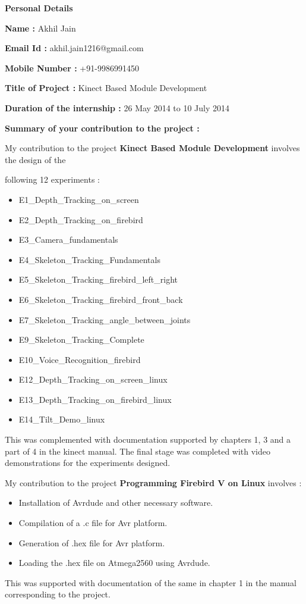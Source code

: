 \documentclass[20pt]{report}
\begin{document}
\hspace{2.5in}
\textbf{Personal Details}
\medskip

\textbf{Name : }
Akhil Jain
\medskip


\textbf{Email Id : }
akhil.jain1216@gmail.com
\medskip


\textbf{Mobile Number : }
+91-9986991450
\medskip


\textbf{Title of Project : }
Kinect Based Module Development
\medskip


\textbf{Duration of the internship : }
26 May 2014 to 10 July 2014
\medskip


\textbf{Summary of your contribution to the project : }

 My contribution to the project \textbf{Kinect Based Module Development} involves the design of the 
 
 following 12 experiments :
\begin{itemize}
\item E1\_Depth\_Tracking\_on\_screen
\item E2\_Depth\_Tracking\_on\_firebird
\item E3\_Camera\_fundamentals
\item E4\_Skeleton\_Tracking\_Fundamentals
\item E5\_Skeleton\_Tracking\_firebird\_left\_right
\item E6\_Skeleton\_Tracking\_firebird\_front\_back
\item E7\_Skeleton\_Tracking\_angle\_between\_joints
\item E9\_Skeleton\_Tracking\_Complete
\item E10\_Voice\_Recognition\_firebird
\item E12\_Depth\_Tracking\_on\_screen\_linux
\item E13\_Depth\_Tracking\_on\_firebird\_linux
\item E14\_Tilt\_Demo\_linux
\end{itemize}
 This was complemented with documentation supported by chapters 1, 3 and a part of 4 in the kinect manual. The final stage was completed with video demonstrations for the experiments designed.
 
My contribution to the project \textbf{Programming Firebird V on Linux} involves :
\begin{itemize}
\item Installation of Avrdude and other necessary software.
\item Compilation of a .c file for Avr platform.
\item Generation of .hex file for Avr platform.
\item Loading the .hex file on Atmega2560 using Avrdude.
\end{itemize}
 This was supported with documentation of the same in chapter 1 in the manual corresponding to the project.
\medskip
\end{document}

